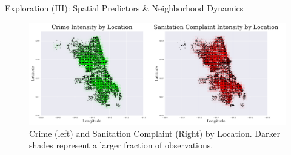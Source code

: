 \begin{column}{\twocolwid}\vspace{-.6in} %


\begin{block}{Exploration (III): Spatial Predictors \& Neighborhood Dynamics}

\begin{figure}
%
\includegraphics[width=\linewidth]{figures/both.pdf}
\caption{Crime (left) and Sanitation Complaint (Right) by Location. Darker shades represent 
a larger fraction of observations. }
\end{figure}

\end{block}
\end{column}
